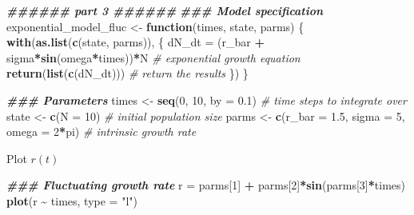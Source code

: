 \documentclass[
]{book}
\newenvironment{Shaded}{\begin{snugshade}}{\end{snugshade}}
\newcommand{\AttributeTok}[1]{\textcolor[rgb]{0.13,0.29,0.53}{#1}}
\newcommand{\CommentTok}[1]{\textcolor[rgb]{0.56,0.35,0.01}{\textit{#1}}}
\newcommand{\ControlFlowTok}[1]{\textcolor[rgb]{0.13,0.29,0.53}{\textbf{#1}}}
\newcommand{\DecValTok}[1]{\textcolor[rgb]{0.00,0.00,0.81}{#1}}
\newcommand{\DocumentationTok}[1]{\textcolor[rgb]{0.56,0.35,0.01}{\textbf{\textit{#1}}}}
\newcommand{\FloatTok}[1]{\textcolor[rgb]{0.00,0.00,0.81}{#1}}
\newcommand{\FunctionTok}[1]{\textcolor[rgb]{0.13,0.29,0.53}{\textbf{#1}}}
\newcommand{\NormalTok}[1]{#1}
\newcommand{\OtherTok}[1]{\textcolor[rgb]{0.56,0.35,0.01}{#1}}
\newcommand{\SpecialCharTok}[1]{\textcolor[rgb]{0.81,0.36,0.00}{\textbf{#1}}}
\newcommand{\StringTok}[1]{\textcolor[rgb]{0.31,0.60,0.02}{#1}}
\begin{document}
\begin{Shaded}
\begin{Highlighting}[]
\DocumentationTok{\#\#\#\#\#\# part 3 \#\#\#\#\#\#}
\DocumentationTok{\#\#\# Model specification}
\NormalTok{exponential\_model\_fluc }\OtherTok{\textless{}{-}} \ControlFlowTok{function}\NormalTok{(times, state, parms) \{}
  \FunctionTok{with}\NormalTok{(}\FunctionTok{as.list}\NormalTok{(}\FunctionTok{c}\NormalTok{(state, parms)), \{}
\NormalTok{    dN\_dt }\OtherTok{=}\NormalTok{ (r\_bar }\SpecialCharTok{+}\NormalTok{ sigma}\SpecialCharTok{*}\FunctionTok{sin}\NormalTok{(omega}\SpecialCharTok{*}\NormalTok{times))}\SpecialCharTok{*}\NormalTok{N  }\CommentTok{\# exponential growth equation}
    \FunctionTok{return}\NormalTok{(}\FunctionTok{list}\NormalTok{(}\FunctionTok{c}\NormalTok{(dN\_dt)))  }\CommentTok{\# return the results}
\NormalTok{  \})}
\NormalTok{\}}
\end{Highlighting}
\end{Shaded}

\begin{Shaded}
\begin{Highlighting}[]
\DocumentationTok{\#\#\# Parameters}
\NormalTok{times }\OtherTok{\textless{}{-}} \FunctionTok{seq}\NormalTok{(}\DecValTok{0}\NormalTok{, }\DecValTok{10}\NormalTok{, }\AttributeTok{by =} \FloatTok{0.1}\NormalTok{)  }\CommentTok{\# time steps to integrate over}
\NormalTok{state }\OtherTok{\textless{}{-}} \FunctionTok{c}\NormalTok{(}\AttributeTok{N =} \DecValTok{10}\NormalTok{)  }\CommentTok{\# initial population size}
\NormalTok{parms }\OtherTok{\textless{}{-}} \FunctionTok{c}\NormalTok{(}\AttributeTok{r\_bar =} \FloatTok{1.5}\NormalTok{, }\AttributeTok{sigma =} \DecValTok{5}\NormalTok{, }\AttributeTok{omega =} \DecValTok{2}\SpecialCharTok{*}\NormalTok{pi)  }\CommentTok{\# intrinsic growth rate}
\end{Highlighting}
\end{Shaded}

Plot \(r(t)\)

\begin{Shaded}
\begin{Highlighting}[]
\DocumentationTok{\#\#\# Fluctuating growth rate}
\NormalTok{r }\OtherTok{=}\NormalTok{ parms[}\DecValTok{1}\NormalTok{] }\SpecialCharTok{+}\NormalTok{ parms[}\DecValTok{2}\NormalTok{]}\SpecialCharTok{*}\FunctionTok{sin}\NormalTok{(parms[}\DecValTok{3}\NormalTok{]}\SpecialCharTok{*}\NormalTok{times)}
\FunctionTok{plot}\NormalTok{(r }\SpecialCharTok{\textasciitilde{}}\NormalTok{ times, }\AttributeTok{type =} \StringTok{"l"}\NormalTok{)}
\end{Highlighting}
\end{Shaded}
\end{document}
